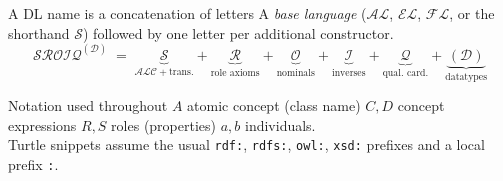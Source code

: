 \documentclass[10pt,aspectratio=169,xcolor=table]{beamer}
\newcommand{\dl}[1]{\ensuremath{\mathcal{#1}}}
\newcommand{\ALC}{\dl{ALC}}
\newcommand{\EL}{\dl{EL}}
\newcommand{\AL}{\dl{AL}}
\newcommand{\SROIQ}{\dl{SROIQ}}
\begin{document}
\begin{frame}{A DL name is a concatenation of letters}
  A \emph{base language} (\AL, \EL, \dl{FL}, or the shorthand \dl{S}) followed by
  one letter per additional constructor.
  \[
    \SROIQ^{(\mathcal{D})} \;=\;
    \underbrace{\dl{S}}_{\ALC + \text{trans.}} +
    \underbrace{\dl{R}}_{\text{role axioms}} +
    \underbrace{\dl{O}}_{\text{nominals}} +
    \underbrace{\dl{I}}_{\text{inverses}} +
    \underbrace{\dl{Q}}_{\text{qual.\ card.}} +
    \underbrace{(\mathcal{D})}_{\text{datatypes}}
  \]
  \vspace{0.5em}
  \begin{block}{Notation used throughout}
    $A$ atomic concept (class name) \quad $C, D$ concept expressions \quad
    $R, S$ roles (properties) \quad $a, b$ individuals.\\
    Turtle snippets assume the usual \texttt{rdf:}, \texttt{rdfs:},
    \texttt{owl:}, \texttt{xsd:} prefixes and a local prefix \texttt{:}.
  \end{block}
\end{frame}
\end{document}
